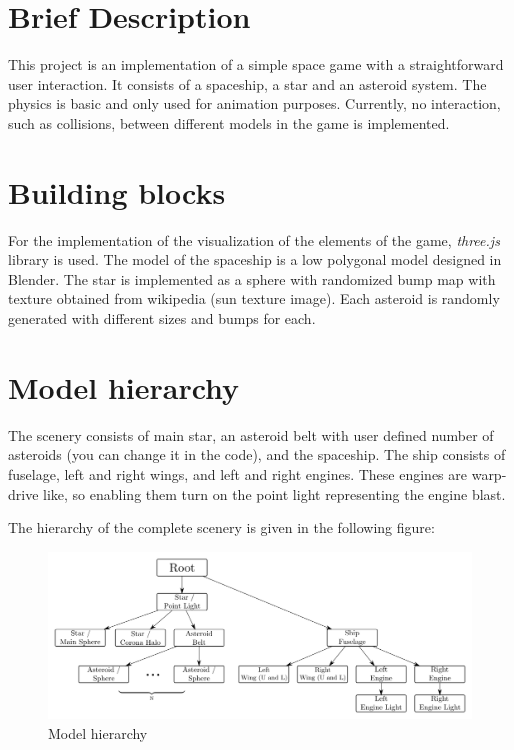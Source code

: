 \documentclass[12pt,a4paper]{report}
\begin{document}
	
	\section{Brief Description}
	
	This project is an implementation of a simple space game with a straightforward user interaction. It consists of a spaceship, a star and an asteroid system. The physics is basic and only used for animation purposes. Currently, no interaction, such as collisions, between different models in the game is implemented.
	
	\section{Building blocks}
	
	For the implementation of the visualization of the elements of the game, \textit{three.js} library is used. The model of the spaceship is a low polygonal model designed in Blender. The star is implemented as a sphere with randomized bump map with texture obtained from wikipedia (sun texture image). Each asteroid is randomly generated with different sizes and bumps for each. 
	
	\section{Model hierarchy}
	
	The scenery consists of main star, an asteroid belt with user defined number of asteroids (you can change it in the code), and the spaceship. The ship consists of fuselage, left and right wings, and left and right engines. These engines are warp-drive like, so enabling them turn on the point light representing the engine blast. 
	
	The hierarchy of the complete scenery is given in the following figure:
	
	\begin{figure}[H]
		\centering
		\includegraphics[width=1.1\linewidth]{img/hierarchy}
		\caption{Model hierarchy}
		\label{fig:hierarchy}
	\end{figure}
	
\end{document}
